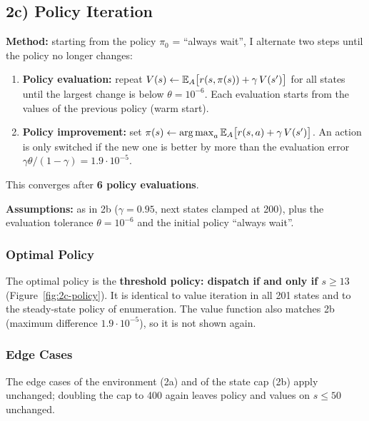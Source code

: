 
\FloatBarrier
\subsection{2c) Policy Iteration}

\textbf{Method:} starting from the policy $\pi_0$ = ``always wait'', I alternate two steps until the policy no longer changes:
\begin{enumerate}
  \item \textbf{Policy evaluation:} repeat $V(s) \leftarrow \mathbb{E}_{A}\big[r(s, \pi(s)) + \gamma\,V(s')\big]$ for all states until the largest change is below $\theta = 10^{-6}$. Each evaluation starts from the values of the previous policy (warm start).
  \item \textbf{Policy improvement:} set $\pi(s) \leftarrow \operatorname*{arg\,max}_a \mathbb{E}_A\big[r(s, a) + \gamma\,V(s')\big]$. An action is only switched if the new one is better by more than the evaluation error $\gamma\theta/(1-\gamma) = 1.9 \cdot 10^{-5}$.
\end{enumerate}
This converges after \textbf{6 policy evaluations}.

\textbf{Assumptions:} as in 2b ($\gamma = 0.95$, next states clamped at 200), plus the evaluation tolerance $\theta = 10^{-6}$ and the initial policy ``always wait''.

\subsubsection{Optimal Policy}


The optimal policy is the \textbf{threshold policy: dispatch if and only if $s \geq 13$} (Figure~\ref{fig:2c-policy}). It is identical to value iteration in all 201 states and to the steady-state policy of enumeration. The value function also matches 2b (maximum difference $1.9 \cdot 10^{-5}$), so it is not shown again.

\subsubsection{Edge Cases}

The edge cases of the environment (2a) and of the state cap (2b) apply unchanged; doubling the cap to 400 again leaves policy and values on $s \leq 50$ unchanged.

